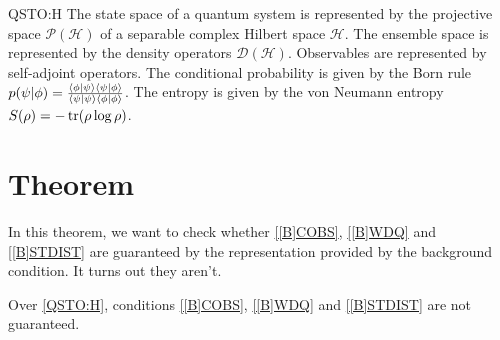 \documentclass{techbrief}
\begin{document}
\begin{condition}{QSTO:H}
	The state space of a quantum system is represented by the projective space $\mathcal{P}(\mathcal{H})$ of a separable complex Hilbert space $\mathcal{H}$. The ensemble space is represented by the density operators $\mathcal{D}(\mathcal{H})$. Observables are represented by self-adjoint operators. The conditional probability is given by the Born rule $p(\psi|\phi) = \frac{\langle \phi | \psi \rangle\langle \psi | \phi \rangle}{\langle \psi | \psi \rangle\langle \phi | \phi \rangle}$. The entropy is given by the von Neumann entropy $S(\rho) = -\operatorname{tr}(\rho \log \rho)$.
\end{condition}

\section{Theorem}

In this theorem, we want to check whether \ref{[B]COBS}, \ref{[B]WDQ} and \ref{[B]STDIST} are guaranteed by the representation provided by the background condition. It turns out they aren't.

\begin{thrm}
	Over \ref{QSTO:H}, conditions \ref{[B]COBS}, \ref{[B]WDQ} and \ref{[B]STDIST} are not guaranteed.
\end{thrm}
\end{document}
